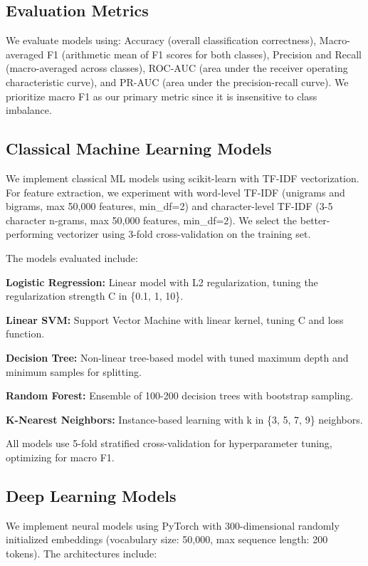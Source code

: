 \documentclass[conference]{IEEEtran}
\begin{document}
\subsection{Evaluation Metrics}

We evaluate models using: Accuracy (overall classification correctness), Macro-averaged F1 (arithmetic mean of F1 scores for both classes), Precision and Recall (macro-averaged across classes), ROC-AUC (area under the receiver operating characteristic curve), and PR-AUC (area under the precision-recall curve). We prioritize macro F1 as our primary metric since it is insensitive to class imbalance.

\subsection{Classical Machine Learning Models}

We implement classical ML models using scikit-learn with TF-IDF vectorization. For feature extraction, we experiment with word-level TF-IDF (unigrams and bigrams, max 50,000 features, min\_df=2) and character-level TF-IDF (3-5 character n-grams, max 50,000 features, min\_df=2). We select the better-performing vectorizer using 3-fold cross-validation on the training set.

The models evaluated include:

\textbf{Logistic Regression:} Linear model with L2 regularization, tuning the regularization strength C in \{0.1, 1, 10\}.

\textbf{Linear SVM:} Support Vector Machine with linear kernel, tuning C and loss function.

\textbf{Decision Tree:} Non-linear tree-based model with tuned maximum depth and minimum samples for splitting.

\textbf{Random Forest:} Ensemble of 100-200 decision trees with bootstrap sampling.

\textbf{K-Nearest Neighbors:} Instance-based learning with k in \{3, 5, 7, 9\} neighbors.

All models use 5-fold stratified cross-validation for hyperparameter tuning, optimizing for macro F1.

\subsection{Deep Learning Models}

We implement neural models using PyTorch with 300-dimensional randomly initialized embeddings (vocabulary size: 50,000, max sequence length: 200 tokens). The architectures include:
\end{document}
